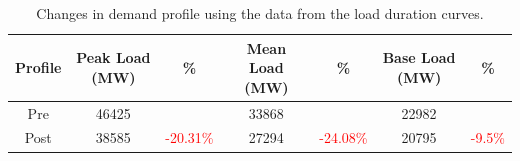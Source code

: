 \documentclass[energies,article,submit,moreauthors,pdftex]{Definitions/mdpi}
\begin{document}
\begin{table}[H]
\caption{Changes in demand profile using the data from the load duration curves. }
\centering
\begin{tabular}{ccccccc}
\toprule
\textbf{Profile} & \textbf{Peak Load (MW)}	& \textbf{\%} & \textbf{ Mean Load (MW)}	& \textbf{\%}	& \textbf{ Base Load (MW)}	& \textbf{\%}\\
\midrule
Pre	& 46425 & & 33868 & & 22982 &  \\
Post & 38585 & \textcolor{red}{-20.31\%} & 27294 & \textcolor{red}{-24.08\%} & 20795 & \textcolor{red}{-9.5\%} \\

\bottomrule
\end{tabular}
\label{table:load-duration}
\end{table}




\end{document}
